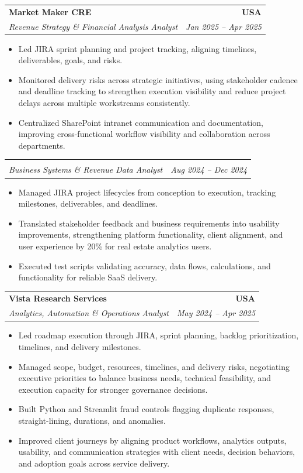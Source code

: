 \documentclass[letterpaper,10pt]{article}
\makeatletter
\newcommand{\resumeItem}[1]{\item \small{#1}}
\newcommand{\resumeSubheading}[4]{
  \vspace{1pt}\item
    \begin{tabular*}{1.0\textwidth}[t]{l@{\extracolsep{\fill}}r}
      \textbf{#1} & \textbf{\small #2} \\
      \textit{\small #3} & \textit{\small #4} \\
    \end{tabular*}\vspace{-6pt}
}
\newcommand{\resumeItemListStart}{\begin{itemize}[leftmargin=0.15in, itemsep=1pt, topsep=3pt]}
\newcommand{\resumeItemListEnd}{\end{itemize}\vspace{-2pt}}
\makeatother
\begin{document}
\vspace{-2pt}

\resumeSubheading
{Market Maker CRE}{USA}
{Revenue Strategy \& Financial Analysis Analyst}{Jan 2025 -- Apr 2025}
\resumeItemListStart
\resumeItem{Led JIRA sprint planning and project tracking, aligning timelines, deliverables, goals, and risks.}
\resumeItem{Monitored delivery risks across strategic initiatives, using stakeholder cadence and deadline tracking to strengthen execution visibility and reduce project delays across multiple workstreams consistently.}
\resumeItem{Centralized SharePoint intranet communication and documentation, improving cross-functional workflow visibility and collaboration across departments.}
\resumeItemListEnd

\vspace{-2pt}

\resumeSubheading
{}{}
{Business Systems \& Revenue Data Analyst}{Aug 2024 -- Dec 2024}
\resumeItemListStart
\resumeItem{Managed JIRA project lifecycles from conception to execution, tracking milestones, deliverables, and deadlines.}
\resumeItem{Translated stakeholder feedback and business requirements into usability improvements, strengthening platform functionality, client alignment, and user experience by 20\% for real estate analytics users.}
\resumeItem{Executed test scripts validating accuracy, data flows, calculations, and functionality for reliable SaaS delivery.}
\resumeItemListEnd

\vspace{-2pt}

\resumeSubheading
{Vista Research Services}{USA}
{Analytics, Automation \& Operations Analyst}{May 2024 -- Apr 2025}
\resumeItemListStart
\resumeItem{Led roadmap execution through JIRA, sprint planning, backlog prioritization, timelines, and delivery milestones.}
\resumeItem{Managed scope, budget, resources, timelines, and delivery risks, negotiating executive priorities to balance business needs, technical feasibility, and execution capacity for stronger governance decisions.}
\resumeItem{Built Python and Streamlit fraud controls flagging duplicate responses, straight-lining, durations, and anomalies.}
\resumeItem{Improved client journeys by aligning product workflows, analytics outputs, usability, and communication strategies with client needs, decision behaviors, and adoption goals across service delivery.}
\resumeItemListEnd

\vspace{-2pt}
\end{document}
